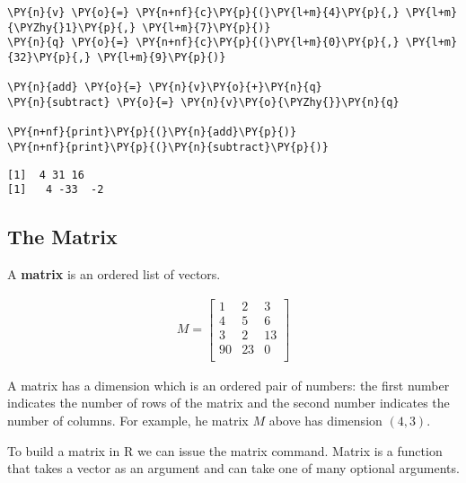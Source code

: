     \begin{tcolorbox}[breakable, size=fbox, boxrule=1pt, pad at break*=1mm,colback=cellbackground, colframe=cellborder]
\begin{Verbatim}[commandchars=\\\{\}]
\PY{n}{v} \PY{o}{=} \PY{n+nf}{c}\PY{p}{(}\PY{l+m}{4}\PY{p}{,} \PY{l+m}{\PYZhy{}1}\PY{p}{,} \PY{l+m}{7}\PY{p}{)}
\PY{n}{q} \PY{o}{=} \PY{n+nf}{c}\PY{p}{(}\PY{l+m}{0}\PY{p}{,} \PY{l+m}{32}\PY{p}{,} \PY{l+m}{9}\PY{p}{)}

\PY{n}{add} \PY{o}{=} \PY{n}{v}\PY{o}{+}\PY{n}{q}
\PY{n}{subtract} \PY{o}{=} \PY{n}{v}\PY{o}{\PYZhy{}}\PY{n}{q}

\PY{n+nf}{print}\PY{p}{(}\PY{n}{add}\PY{p}{)}
\PY{n+nf}{print}\PY{p}{(}\PY{n}{subtract}\PY{p}{)}
\end{Verbatim}
\end{tcolorbox}

    \begin{Verbatim}[commandchars=\\\{\}]
[1]  4 31 16
[1]   4 -33  -2
    \end{Verbatim}

    \hypertarget{the-matrix}{%
\subsection{The Matrix}\label{the-matrix}}

A \textbf{matrix} is an ordered list of vectors.

\begin{align}
    M = \left [ \begin{matrix}
            1 & 2 & 3 \\
            4 & 5 & 6 \\
            3 & 2 & 13 \\
            90 & 23 & 0 \\
         \end{matrix} \right ]   
\end{align}

A matrix has a dimension which is an ordered pair of numbers: the first
number indicates the number of rows of the matrix and the second number
indicates the number of columns. For example, he matrix \(M\) above has
dimension \((4,3)\).

To build a matrix in R we can issue the matrix command. Matrix is a
function that takes a vector as an argument and can take one of many
optional arguments.

